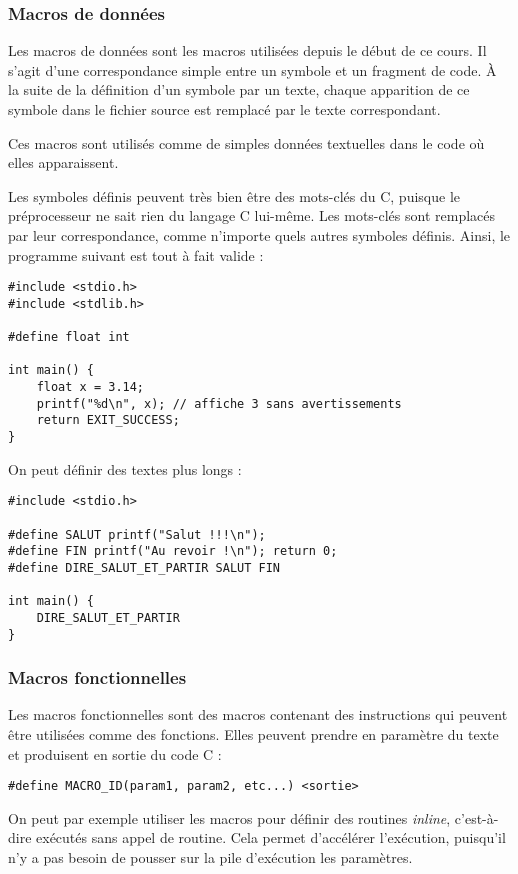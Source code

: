 \documentclass[../../../main.tex]{subfiles}
\begin{document}
\subsubsection{Macros de données}\label{ssub:macros_donnees}
Les macros de données sont les macros utilisées depuis le début de ce cours. Il s'agit d'une correspondance simple entre un symbole et un fragment de code. À la suite de la définition d'un symbole par un texte, chaque apparition de ce symbole dans le fichier source est remplacé par le texte correspondant.

Ces macros sont utilisés comme de simples données textuelles dans le code où elles apparaissent.

Les symboles définis peuvent très bien être des mots-clés du C, puisque le préprocesseur ne sait rien du langage C lui-même. Les mots-clés sont remplacés par leur correspondance, comme n'importe quels autres symboles définis. Ainsi, le programme suivant est tout à fait valide :
\begin{verbatim}
#include <stdio.h>
#include <stdlib.h>

#define float int

int main() {
	float x = 3.14;
	printf("%d\n", x); // affiche 3 sans avertissements
	return EXIT_SUCCESS;
}
\end{verbatim}
On peut définir des textes plus longs :
\begin{verbatim}
#include <stdio.h>

#define SALUT printf("Salut !!!\n");
#define FIN printf("Au revoir !\n"); return 0;
#define DIRE_SALUT_ET_PARTIR SALUT FIN

int main() {
	DIRE_SALUT_ET_PARTIR
}
\end{verbatim}
\subsubsection{Macros fonctionnelles}\label{ssub:macros_fonctions}
Les macros fonctionnelles sont des macros contenant des instructions qui peuvent être utilisées comme des fonctions. Elles peuvent prendre en paramètre du texte et produisent en sortie du code C :
\begin{verbatim}
#define MACRO_ID(param1, param2, etc...) <sortie>
\end{verbatim}
On peut par exemple utiliser les macros pour définir des routines \textit{inline}, c'est-à-dire exécutés sans appel de routine. Cela permet d'accélérer l'exécution, puisqu'il n'y a pas besoin de pousser sur la pile d'exécution les paramètres.
\end{document}
